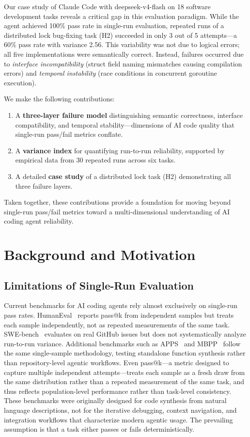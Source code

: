 \documentclass[conference]{IEEEtran}
\begin{document}
Our case study of Claude Code with deepseek-v4-flash on 18 software development tasks reveals a critical gap in this evaluation paradigm.
While the agent achieved 100\% pass rate in single-run evaluation, repeated runs of a distributed lock bug-fixing task (H2) succeeded in only 3 out of 5 attempts---a 60\% pass rate with variance 2.56.
This variability was not due to logical errors; all five implementations were semantically correct.
Instead, failures occurred due to \textit{interface incompatibility} (struct field naming mismatches causing compilation errors) and \textit{temporal instability} (race conditions in concurrent goroutine execution).

We make the following contributions:

\begin{enumerate}
\item A \textbf{three-layer failure model} distinguishing semantic correctness, interface compatibility, and temporal stability---dimensions of AI code quality that single-run pass/fail metrics conflate.
\item A \textbf{variance index} for quantifying run-to-run reliability, supported by empirical data from 30 repeated runs across six tasks.
\item A detailed \textbf{case study} of a distributed lock task (H2) demonstrating all three failure layers.
\end{enumerate}
Taken together, these contributions provide a foundation for moving beyond single-run pass/fail metrics toward a multi-dimensional understanding of AI coding agent reliability.

\section{Background and Motivation}

\subsection{Limitations of Single-Run Evaluation}

Current benchmarks for AI coding agents rely almost exclusively on single-run pass rates.
HumanEval~\cite{chen2021evaluating} reports pass@k from independent samples but treats each sample independently, not as repeated measurements of the same task.
SWE-bench~\cite{jimenez2023swebench} evaluates on real GitHub issues but does not systematically analyze run-to-run variance.
Additional benchmarks such as APPS~\cite{hendrycks2021measuring} and MBPP~\cite{austin2021program} follow the same single-sample methodology, testing standalone function synthesis rather than repository-level agentic workflows.
Even pass@k---a metric designed to capture multiple independent attempts---treats each sample as a fresh draw from the same distribution rather than a repeated measurement of the same task, and thus reflects population-level performance rather than task-level consistency.
These benchmarks were originally designed for code synthesis from natural language descriptions, not for the iterative debugging, context navigation, and integration workflows that characterize modern agentic usage.
The prevailing assumption is that a task either passes or fails deterministically.
\end{document}
